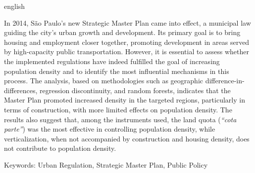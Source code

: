 \documentclass[
  a4paper, 
  12pt, 
  openany, 
  oneside, 
  brazil,
  english
]{abntex2}
\begin{document}

\begin{resumo}[Abstract]
 \begin{otherlanguage*}{english}

  In 2014, São Paulo's new Strategic Master Plan came into effect, a municipal law guiding the city's urban growth and development. Its primary goal is to bring housing and employment closer together, promoting development in areas served by high-capacity public transportation. However, it is essential to assess whether the implemented regulations have indeed fulfilled the goal of increasing population density and to identify the most influential mechanisms in this process. The analysis, based on methodologies such as geographic difference-in-differences, regression discontinuity, and random forests, indicates that the Master Plan promoted increased density in the targeted regions, particularly in terms of construction, with more limited effects on population density. The results also suggest that, among the instruments used, the land quota (\textit{``cota parte''}) was the most effective in controlling population density, while verticalization, when not accompanied by construction and housing density, does not contribute to population density.

  Keywords: Urban Regulation, Strategic Master Plan, Public Policy

 \end{otherlanguage*}
\end{resumo}




\textual
\pagestyle{tccinsper} %



\postextual
 





% 
% 
%



% 



\end{document}

